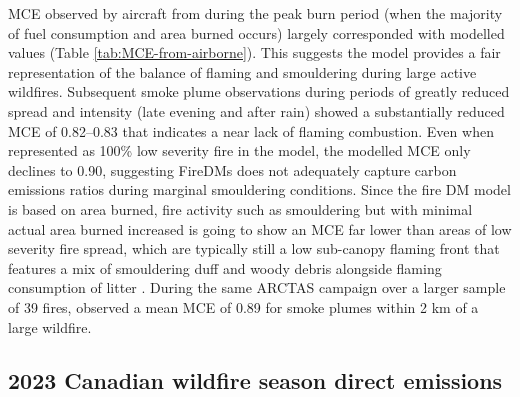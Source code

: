 \documentclass[, manuscript]{copernicus}
\begin{document}
\begin{table}
\centering\centering
\caption{\label{tab:MCE-from-airborne}Comparison of the Modified Combustion Efficiency (MCE) of airborne gas measurements of Canadian wildfires against modelled MCE}
\centering
{}
\end{table}

MCE observed by aircraft from \citet{hornbrook2011} during the peak burn
period (when the majority of fuel consumption and area burned occurs)
largely corresponded with modelled values (Table
\ref{tab:MCE-from-airborne}). This suggests the model provides a fair
representation of the balance of flaming and smouldering during large
active wildfires. Subsequent smoke plume observations during periods of
greatly reduced spread and intensity (late evening and after rain)
showed a substantially reduced MCE of 0.82--0.83 that indicates a near
lack of flaming combustion. Even when represented as 100\% low severity
fire in the model, the modelled MCE only declines to 0.90, suggesting
FireDMs does not adequately capture carbon emissions ratios during
marginal smouldering conditions. Since the fire DM model is based on
area burned, fire activity such as smouldering but with minimal actual
area burned increased is going to show an MCE far lower than areas of
low severity fire spread, which are typically still a low sub-canopy
flaming front that features a mix of smouldering duff and woody debris
alongside flaming consumption of litter \citep{mcrae1994, mcrae2017}.
During the same ARCTAS campaign over a larger sample of 39 fires,
\citet{vayPatternsCO2Radiocarbon2011} observed a mean MCE of 0.89 for
smoke plumes within 2 km of a large wildfire.

\subsection{2023 Canadian wildfire season direct emissions}
\end{document}
